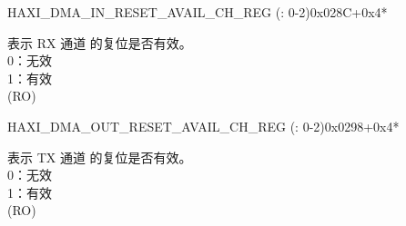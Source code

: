 \begin{register}{H}{AXI\_DMA\_IN\_RESET\_AVAIL\_CH\_REG (: 0-2)}{0x028C+0x4*}\label{regdesc:AXIDMAINRESETAVAILCHNREG}
%
%
\regnewline%
\begin{regdesc}\begin{reglist}
\label{fielddesc:AXIDMAINRESETAVAILCHN}\item [AXI\_DMA\_IN\_RESET\_AVAIL\_CH\regindex{n}] 表示 RX 通道  的复位是否有效。\\0：无效\\1：有效\\ (RO)
\end{reglist}\end{regdesc}
\end{register}


\begin{register}{H}{AXI\_DMA\_OUT\_RESET\_AVAIL\_CH\_REG (: 0-2)}{0x0298+0x4*}\label{regdesc:AXIDMAOUTRESETAVAILCHNREG}
%
%
\regnewline%
\begin{regdesc}\begin{reglist}
\label{fielddesc:AXIDMAOUTRESETAVAILCHN}\item [AXI\_DMA\_OUT\_RESET\_AVAIL\_CH\regindex{n}] 表示 TX 通道  的复位是否有效。\\0：无效\\1：有效\\ (RO)
\end{reglist}\end{regdesc}
\end{register}


